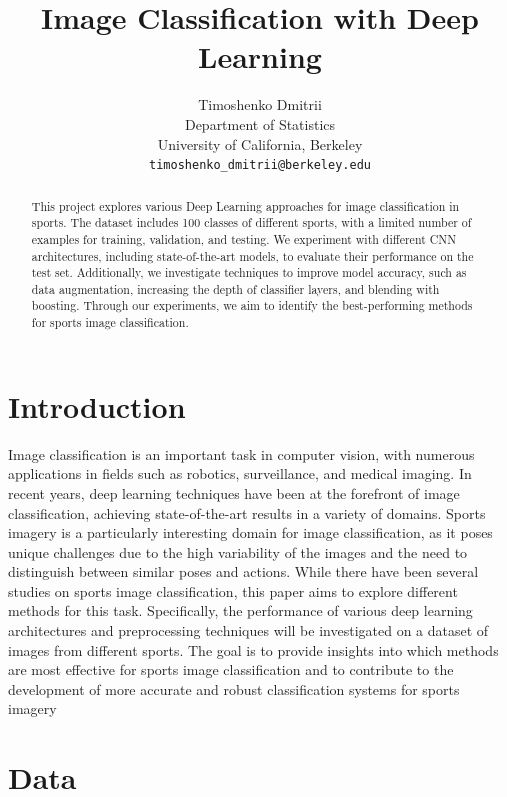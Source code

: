 \documentclass[reqno]{article}
\title{Image Classification with Deep Learning}
\author{
	Timoshenko Dmitrii\\
	Department of Statistics\\
	University of California, Berkeley\\
	\texttt{timoshenko\_dmitrii@berkeley.edu} \\
}
\begin{document}
	
	\maketitle
	
	\begin{abstract}
				This project explores various Deep Learning approaches for image classification in sports. The dataset includes 100 classes of different sports, with a limited number of examples for training, validation, and testing. We experiment with different CNN architectures, including state-of-the-art models, to evaluate their performance on the test set. Additionally, we investigate techniques to improve model accuracy, such as data augmentation, increasing the depth of classifier layers, and blending with boosting. Through our experiments, we aim to identify the best-performing methods for sports image classification.
	\end{abstract}
	
	\section{Introduction}
	Image classification is an important task in computer vision, with numerous applications in fields such as robotics, surveillance, and medical imaging. In recent years, deep learning techniques have been at the forefront of image classification, achieving state-of-the-art results in a variety of domains. Sports imagery is a particularly interesting domain for image classification, as it poses unique challenges due to the high variability of the images and the need to distinguish between similar poses and actions. While there have been several studies on sports image classification, this paper aims to explore different methods for this task. Specifically, the performance of various deep learning architectures and preprocessing techniques will be investigated on a dataset of images from different sports. The goal is to provide insights into which methods are most effective for sports image classification and to contribute to the development of more accurate and robust classification systems for sports imagery
	
	\section{Data}
	
\end{document}

